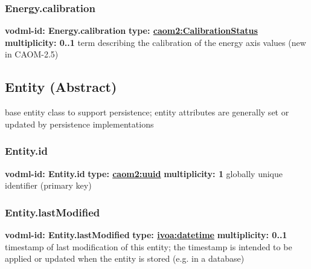     \subsubsection{Energy.calibration}
      \textbf{vodml-id: Energy.calibration} \newline
      \textbf{type: \hyperref[sect:CalibrationStatus]{caom2:CalibrationStatus}} \newline
      \textbf{multiplicity: 0..1} \newline
      term describing the calibration of the energy axis values (new in CAOM-2.5)

  \subsection{Entity (Abstract)}
  \label{sect:Entity}
    base entity class to support persistence; entity attributes are generally set or updated by persistence implementations

    \subsubsection{Entity.id}
      \textbf{vodml-id: Entity.id} \newline
      \textbf{type: \hyperref[sect:uuid]{caom2:uuid}} \newline
      \textbf{multiplicity: 1} \newline
      globally unique identifier (primary key)

    \subsubsection{Entity.lastModified}
      \textbf{vodml-id: Entity.lastModified} \newline
      \textbf{type: \hyperref[sect:ivoa]{ivoa:datetime}} \newline
      \textbf{multiplicity: 0..1} \newline
      timestamp of last modification of this entity; the timestamp is intended to be applied or updated when the entity is stored (e.g. in a database)

